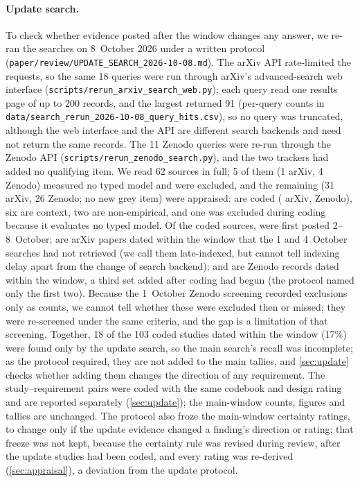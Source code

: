 \paragraph{Update search.}
To check whether evidence posted after the window changes any answer, we re-ran the searches on 8~October 2026 under a written protocol (\nolinkurl{paper/review/UPDATE_SEARCH_2026-10-08.md}).
The arXiv API rate-limited the requests, so the same 18 queries were run through arXiv's advanced-search web interface (\nolinkurl{scripts/rerun_arxiv_search_web.py}); each query read one results page of up to 200 records, and the largest returned 91 (per-query counts in \nolinkurl{data/search_rerun_2026-10-08_query_hits.csv}), so no query was truncated, although the web interface and the API are different search backends and need not return the same records.
The 11 Zenodo queries were re-run through the Zenodo API (\nolinkurl{scripts/rerun_zenodo_search.py}), and the two trackers had added no qualifying item.
We read 62 sources in full; 5 of them (1 arXiv, 4 Zenodo) measured no typed model and were excluded, and the remaining \nUDocs{} (31 arXiv, 26 Zenodo; no new grey item) were appraised: \nUCoded{} are coded (\nUArxiv{} arXiv, \nUZenodo{} Zenodo), six are context, two are non-empirical, and one was excluded during coding because it evaluates no typed model.
Of the coded sources, \nUSetPostWindow{} were first posted 2--8~October; \nUSetLateIndexed{} are arXiv papers dated within the window that the 1 and 4~October searches had not retrieved (we call them late-indexed, but cannot tell indexing delay apart from the change of search backend); and \nUSetReScreened{} are Zenodo records dated within the window, a third set added after coding had begun (the protocol named only the first two).
Because the 1~October Zenodo screening recorded exclusions only as counts, we cannot tell whether these \nUSetReScreened{} were excluded then or missed; they were re-screened under the same criteria, and the gap is a limitation of that screening.
Together, 18 of the 103 coded studies dated within the window (17\%) were found only by the update search, so the main search's recall was incomplete; as the protocol required, they are not added to the main tallies, and \cref{sec:update} checks whether adding them changes the direction of any requirement.
The \nURows{} study--requirement pairs were coded with the same codebook and design rating and are reported separately (\cref{sec:update}); the main-window counts, figures and tallies are unchanged. The protocol also froze the main-window certainty ratings, to change only if the update evidence changed a finding's direction or rating; that freeze was not kept, because the certainty rule was revised during review, after the update studies had been coded, and every rating was re-derived (\cref{sec:appraisal}), a deviation from the update protocol.
